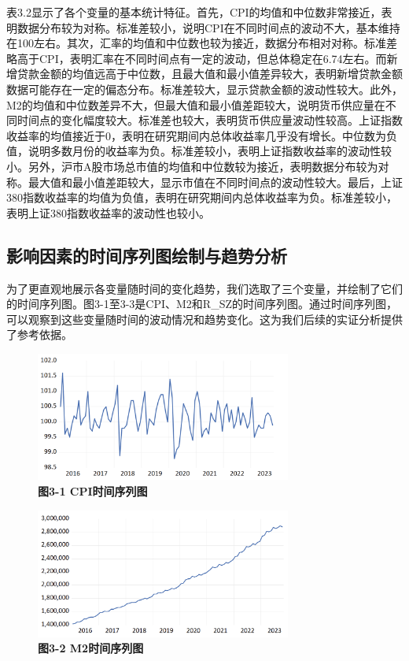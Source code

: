 \documentclass[12pt, a4paper]{article}
\numberwithin{equation}{section}
\begin{document}
表3.2显示了各个变量的基本统计特征。首先，CPI的均值和中位数非常接近，表明数据分布较为对称。标准差较小，说明CPI在不同时间点的波动不大，基本维持在100左右。其次，汇率的均值和中位数也较为接近，数据分布相对对称。标准差略高于CPI，表明汇率在不同时间点有一定的波动，但总体稳定在6.74左右。而新增贷款金额的均值远高于中位数，且最大值和最小值差异较大，表明新增贷款金额数据可能存在一定的偏态分布。标准差较大，显示贷款金额的波动性较大。此外，M2的均值和中位数差异不大，但最大值和最小值差距较大，说明货币供应量在不同时间点的变化幅度较大。标准差也较大，表明货币供应量波动性较高。上证指数收益率的均值接近于0，表明在研究期间内总体收益率几乎没有增长。中位数为负值，说明多数月份的收益率为负。标准差较小，表明上证指数收益率的波动性较小。另外，沪市A股市场总市值的均值和中位数较为接近，表明数据分布较为对称。最大值和最小值差距较大，显示市值在不同时间点的波动性较大。最后，上证380指数收益率的均值为负值，表明在研究期间内总体收益率为负。标准差较小，表明上证380指数收益率的波动性也较小。

\subsection{影响因素的时间序列图绘制与趋势分析}
为了更直观地展示各变量随时间的变化趋势，我们选取了三个变量，并绘制了它们的时间序列图。图3-1至3-3是CPI、M2和R\_SZ的时间序列图。通过时间序列图，可以观察到这些变量随时间的波动情况和趋势变化。这为我们后续的实证分析提供了参考依据。

\begin{figure}[h!]
    \centering
    \includegraphics[width=0.75\textwidth]{./img/cpi.png}
    \captionsetup{labelformat=empty}
    \caption{\textbf{\fontsize{9pt}{11pt}\selectfont 图3-1 CPI时间序列图}}
\end{figure}

\begin{figure}[h!]
    \centering
    \includegraphics[width=0.75\textwidth]{./img/m2.png}
    \captionsetup{labelformat=empty}
    \caption{\textbf{\fontsize{9pt}{11pt}\selectfont 图3-2 M2时间序列图}}
\end{figure}
\end{document}
